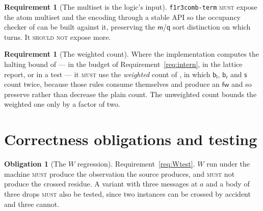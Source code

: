 \documentclass[11pt,a4paper]{article}
\newcommand{\code}[1]{\texttt{#1}}
\newcommand{\MUST}{\textsc{must}}
\newcommand{\SHOULDNOT}{\textsc{should not}}
\newcommand{\mm}{\mathsf{m}}
\newcommand{\fw}{\mathsf{fw}}
\newcommand{\bl}{\mathsf{b}_{\mathsf{l}}}
\newcommand{\br}{\mathsf{b}_{\mathsf{r}}}
\newcommand{\sy}{\mathsf{s}}
\newcommand{\qq}{\mathsf{q}}
\theoremstyle{definition}
\newtheorem{requirement}[definition]{Requirement}
\newtheorem{obligation}[definition]{Obligation}
\theoremstyle{plain}
\begin{document}
\begin{requirement}[The multiset is the logic's input]\label{req:logicinput}
\code{f1r3comb-term} \MUST{} expose the atom multiset and the encoding through
a stable API so the occupancy checker of \cite[\S6]{logic} can be built
against it, preserving the $\mm$/$\qq$ sort distinction on which
\cite[Rem.~2.5]{logic} turns. It \SHOULDNOT{} expose more.
\end{requirement}

\begin{requirement}[The weighted count]\label{req:weighted}
Where the implementation computes the halting bound of
\cite[Prop.~9.9]{draft3} --- in the budget of Requirement~\ref{req:intern}, in
the lattice report, or in a test --- it \MUST{} use the \emph{weighted} count
of \cite[Def.~6.6]{logic}, in which $\bl$, $\br$ and $\sy$ count twice,
because those rules consume themselves and produce an $\fw$ and so preserve
rather than decrease the plain count. The unweighted count bounds the weighted
one only by a factor of two.
\end{requirement}

\section{Correctness obligations and testing}\label{sec:test}

\begin{obligation}[The $W$ regression]\label{obl:W}
Requirement~\ref{req:Wtest}. $W$ run under the machine \MUST{} produce the
observation the source produces, and \MUST{} not produce the crossed residue.
A variant with three messages at $a$ and a body of three drops \MUST{} also be
tested, since two instances can be crossed by accident and three cannot.
\end{obligation}
\end{document}
